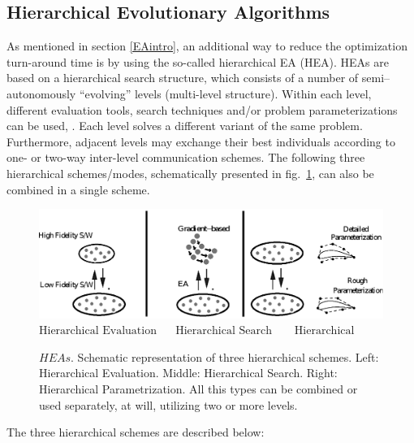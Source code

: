 \subsection{Hierarchical Evolutionary Algorithms}

As mentioned in section \ref{EAintro}, an additional way to reduce the optimization turn-around time is by using the so-called hierarchical EA (HEA). HEAs are based on a hierarchical search structure, which consists of a number of semi–autonomously ``evolving'' levels (multi-level structure). Within each level, different evaluation tools, search techniques and/or problem parameterizations can be used, \cite{Herr1999, kn:Sef2000, Desid2003, LTT_2_031, LTT_3_092, LTT_2_036, LTT_2_044, LTT_2_048, LTT_4_05}. Each level solves a different variant of the same problem. Furthermore, adjacent levels may exchange their best individuals according to one- or two-way inter-level communication schemes. The following three hierarchical schemes/modes, schematically presented in fig.\ \ref{allheas}, can also be combined in a single scheme.


\begin{figure}[h!]
    \centering
    \includegraphics[scale=0.8]{multimodes.eps}
    $\mbox{Hierarchical Evaluation~~~~~Hierarchical Search~~~~~~Hierarchical Parameterization}$
    \caption{$HEAs$. Schematic representation of  three
            hierarchical schemes. Left: Hierarchical Evaluation. Middle: Hierarchical Search. Right: Hierarchical Parametrization. All this types can be combined or used separately, at will, utilizing two or more levels.}
    \label{allheas}
\end{figure}      

The three hierarchical schemes are described below:
